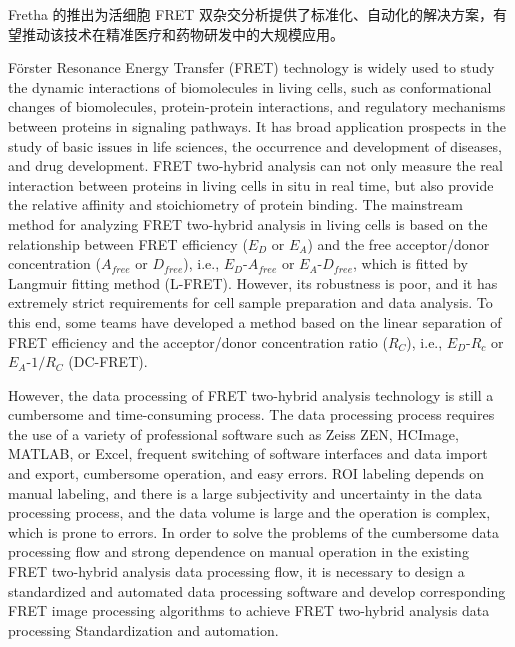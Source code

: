 \begin{cabstract}
Fretha 的推出为活细胞 FRET 双杂交分析提供了标准化、自动化的解决方案，有望推动该技术在精准医疗和药物研发中的大规模应用。
\fi
\end{cabstract}


\begin{eabstract}

\ifshowtext
Förster Resonance Energy Transfer (FRET) technology is widely used to study the dynamic interactions of biomolecules in living cells, such as conformational changes of biomolecules, protein-protein interactions, and regulatory mechanisms between proteins in signaling pathways. It has broad application prospects in the study of basic issues in life sciences, the occurrence and development of diseases, and drug development.
FRET two-hybrid analysis can not only measure the real interaction between proteins in living cells in situ in real time, but also provide the relative affinity and stoichiometry of protein binding.
The mainstream method for analyzing FRET two-hybrid analysis in living cells is based on the relationship between FRET efficiency ($E_D$ or $E_A$) and the free acceptor/donor concentration ($A_{free}$ or $D_{free}$), i.e., $E_D$-$A_{free}$ or $E_A$-$D_{free}$, which is fitted by Langmuir fitting method (L-FRET). However, its robustness is poor, and it has extremely strict requirements for cell sample preparation and data analysis.
To this end, some teams have developed a method based on the linear separation of FRET efficiency and the acceptor/donor concentration ratio ($R_C$), i.e., $E_D$-$R_c$ or $E_A$-$1/R_C$ (DC-FRET).

However, the data processing of FRET two-hybrid analysis technology is still a cumbersome and time-consuming process.
The data processing process requires the use of a variety of professional software such as Zeiss ZEN, HCImage, MATLAB, or Excel, frequent switching of software interfaces and data import and export, cumbersome operation, and easy errors.
ROI labeling depends on manual labeling, and there is a large subjectivity and uncertainty in the data processing process, and the data volume is large and the operation is complex, which is prone to errors.
In order to solve the problems of the cumbersome data processing flow and strong dependence on manual operation in the existing FRET two-hybrid analysis data processing flow, it is necessary to design a standardized and automated data processing software and develop corresponding FRET image processing algorithms to achieve FRET two-hybrid analysis data processing Standardization and automation.


\end{eabstract}
